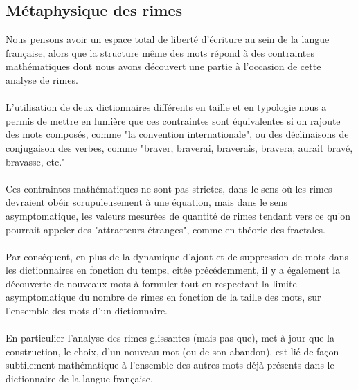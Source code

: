 \documentclass[french]{article}
\begin{document}
\subsection{Métaphysique des rimes}
Nous pensons avoir un espace total de liberté d'écriture au sein de la langue française, alors que la structure même des mots répond à des contraintes mathématiques dont nous avons découvert une partie à l'occasion de cette analyse de rimes.\\
\\
L'utilisation de deux dictionnaires différents en taille et en typologie nous a permis de mettre en lumière que ces contraintes sont équivalentes si on rajoute des mots composés, comme "la convention internationale", ou des déclinaisons de conjugaison des verbes, comme "braver, braverai, braverais, bravera, aurait bravé, bravasse, etc."\\
\\
Ces contraintes mathématiques ne sont pas strictes, dans le sens où les rimes devraient obéir scrupuleusement à une équation, mais dans le sens asymptomatique, les valeurs mesurées de quantité de rimes tendant vers ce qu'on pourrait appeler des "attracteurs étranges", comme en théorie des fractales.\\
\\
Par conséquent, en plus de la dynamique d'ajout et de suppression de mots dans les dictionnaires en fonction du temps, citée précédemment, il y a également la découverte de nouveaux mots à formuler tout en respectant la limite asymptomatique du nombre de rimes en fonction de la taille des mots, sur l'ensemble des mots d'un dictionnaire.\\
\\
En particulier l'analyse des rimes glissantes (mais pas que), met à jour que la construction, le choix, d'un nouveau mot (ou de son abandon), est lié de façon subtilement mathématique à l'ensemble des autres mots déjà présents dans le dictionnaire de la langue française.
\end{document}
